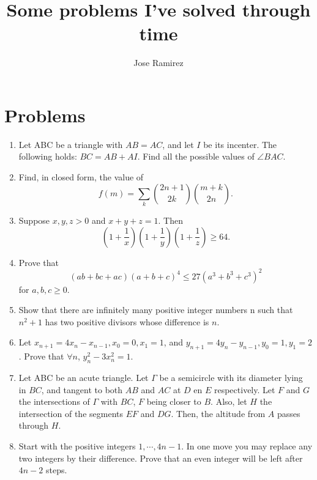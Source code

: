 \documentclass{article}
\title{Some problems I've solved through time}
\author{Jose Ramirez}
\begin{document}
\maketitle

\section{Problems}
\label{sec:Problems}

\begin{enumerate}

\item Let ABC be a triangle with $AB=AC$, and let $I$  be its incenter. The following holds: $BC=AB+AI$. Find all the possible values of $\angle BAC$.

\item Find, in closed form, the value of $$f(m) = \sum_{k} \binom{2n + 1}{2k}\binom{m + k}{2n}.$$

\item Suppose $x, y, z > 0$ and $x + y + z = 1$. Then $$\left(1 + \frac{1}{x}\right)\left(1 + \frac{1}{y}\right)\left(1 + \frac{1}{z}\right) \geq 64.$$

\item Prove that $$(ab + bc + ac)(a + b + c)^4 \leq 27(a^3 + b^3 + c^3)^{2}$$ for $a, b, c \geq 0.$

\item Show that there are infinitely many positive integer numbers n such that $n^2 + 1$ has two positive divisors whose difference is $n$.

\item Let $x_{n + 1} = 4x_{n} - x_{n - 1}, x_0 = 0, x_1 = 1$, and $y_{n + 1} = 4y_{n} - y_{n - 1}, y_0 = 1, y_1 = 2$. Prove that $\forall n$, $y_{n}^2 - 3x_{n}^2 = 1$.

\item Let ABC be an acute triangle. Let $\Gamma$ be a semicircle with its diameter lying in $BC$, and tangent to both $AB$ and $AC$ at $D$ en $E$ respectively. Let $F$ and $G$ the intersections of $\Gamma$ with $BC$, $F$ being closer to $B$. Also, let $H$ the intersection of the segments $EF$ and $DG$. Then, the altitude from $A$ passes through $H$.

\item Start with the positive integers $1, \cdots, 4n - 1$. In one move you may replace any two integers by their difference. Prove that an even integer will be left after $4n - 2$ steps.

\end{enumerate}
\end{document}

